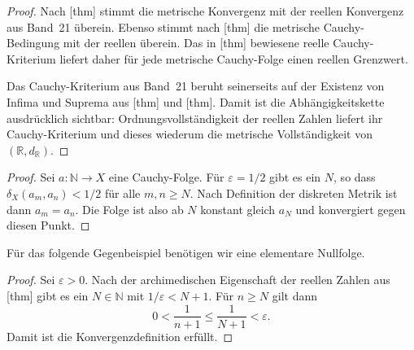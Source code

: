 \documentclass[main.tex]{subfiles}
\begin{document}
\begin{proof}
Nach [thm] stimmt die
metrische Konvergenz mit der reellen Konvergenz aus Band~21 überein. Ebenso
stimmt nach
[thm] die metrische
Cauchy-Bedingung mit der reellen überein. Das in
[thm] bewiesene reelle
Cauchy-Kriterium liefert daher für jede metrische Cauchy-Folge einen reellen
Grenzwert.

Das Cauchy-Kriterium aus Band~21 beruht seinerseits auf der Existenz von
Infima und Suprema aus
[thm] und
[thm]. Damit ist die
Abhängigkeitskette ausdrücklich sichtbar:
Ordnungsvollständigkeit der reellen Zahlen liefert ihr Cauchy-Kriterium und
dieses wiederum die metrische Vollständigkeit von
\((\mathbb R,d_{\mathbb R})\).
\end{proof}

\begin{proof}
Sei \(a\colon\mathbb N\to X\) eine Cauchy-Folge. Für
\(\varepsilon=1/2\) gibt es ein \(N\), so dass
\(\delta_X(a_m,a_n)<1/2\) für alle \(m,n\geq N\). Nach Definition der
diskreten Metrik ist dann \(a_m=a_n\). Die Folge ist also ab \(N\) konstant
gleich \(a_N\) und konvergiert gegen diesen Punkt.
\end{proof}

Für das folgende Gegenbeispiel benötigen wir eine elementare Nullfolge.

\begin{proof}
Sei \(\varepsilon>0\). Nach der archimedischen Eigenschaft der reellen
Zahlen aus [thm] gibt es ein
\(N\in\mathbb N\) mit \(1/\varepsilon<N+1\). Für \(n\geq N\) gilt dann
\[
 0<\frac1{n+1}\leq\frac1{N+1}<\varepsilon.
\]
Damit ist die Konvergenzdefinition erfüllt.
\end{proof}
\end{document}
